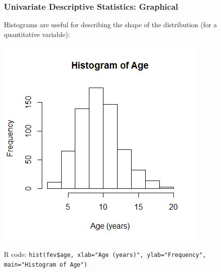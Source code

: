 \documentclass[12pt, 
hyperref={colorlinks=true, linkcolor=blue, urlcolor=cyan}]{beamer}
\begin{document}
\begin{frame}
\frametitle{Univariate Descriptive Statistics: Graphical}

Histograms are useful for describing the shape of the distribution (for a quantitative variable):\vspace{-0.7cm}

\center \includegraphics[height=0.6\textheight]{./histogram-age}

\vspace{-0.45cm} \begin{scriptsize} R code:  \texttt{hist(fev\$age, xlab="Age (years)", ylab="Frequency", main="Histogram of Age")\\} \end{scriptsize}

\end{frame}
\end{document}
